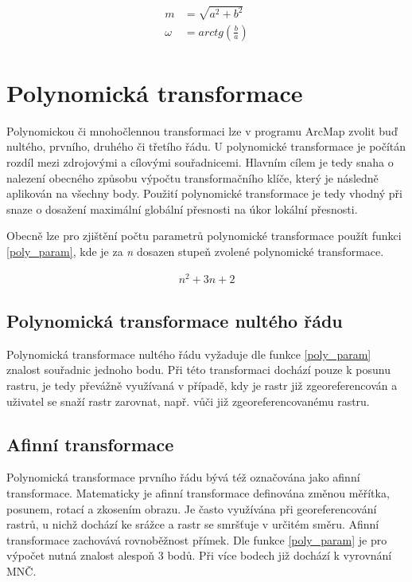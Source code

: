 \documentclass[thesis=M,czech]{FITthesis}[2012/06/26]
\begin{document}
 \begin{align}  \label{podobn_sub} 
\begin{split}
m &= \sqrt{a^2 + b^2} \\
\omega &= arctg(\frac{b}{a})
\end{split}
\end{align}



\section{Polynomická transformace}
Polynomickou či mnohočlennou transformaci lze v programu ArcMap zvolit buď nultého, prvního, druhého či třetího řádu. U polynomické transformace je počítán rozdíl mezi zdrojovými a cílovými souřadnicemi. Hlavním cílem je tedy snaha o nalezení obecného způsobu výpočtu transformačního klíče, který je následně aplikován na všechny body. Použití polynomické transformace je tedy vhodný při snaze o dosažení maximální globální přesnosti na úkor lokální přesnosti.

Obecně lze pro zjištění počtu parametrů polynomické transformace použít funkci \eqref{poly_param}, kde je za \textit{n} dosazen stupeň zvolené polynomické transformace. 

\begin{align}
   \label{poly_param} n^2 + 3n + 2
\end{align}


\subsection{Polynomická transformace nultého řádu}
Polynomická transformace nultého řádu vyžaduje dle funkce \eqref{poly_param} znalost souřadnic jednoho bodu. Při této transformaci dochází pouze k posunu rastru, je tedy převážně využívaná v případě, kdy je rastr již zgeoreferencován a uživatel se snaží rastr zarovnat, např. vůči již zgeoreferencovanému rastru.

\subsection{Afinní transformace}
Polynomická transformace prvního řádu bývá též označována jako afinní transformace. Matematicky je afinní transformace definována změnou měřítka, posunem, rotací a zkosením obrazu. Je často využívána při georeferencování rastrů, u nichž dochází ke srážce a rastr se smršťuje v určitém směru. Afinní transformace zachovává rovnoběžnost přímek. Dle funkce \eqref{poly_param} je pro výpočet nutná znalost alespoň 3 bodů.  Při více bodech již dochází k vyrovnání MNČ. 
\end{document}
